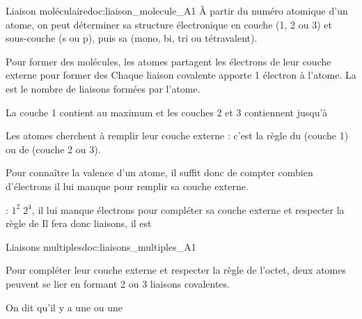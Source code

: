 \begin{doc}{Liaison moléculaire}{doc:liaison_molecule_A1}
  À partir du numéro atomique d'un atome, on peut déterminer sa structure électronique en couche (1, 2 ou 3) et sous-couche (s ou p), puis sa  (mono, bi, tri ou tétravalent).
  \begin{importants}
    Pour former des molécules, les atomes partagent les électrons de leur couche externe pour former des 
    Chaque liaison covalente apporte 1 électron à l'atome.
    La  est le nombre de liaisons formées par l'atome.
  \end{importants}
  \begin{importants}
    La couche 1 contient au maximum  et les couches 2 et 3 contiennent jusqu'à 

    Les atomes cherchent à remplir leur couche externe : c'est la règle du  (couche 1) ou de  (couche 2 ou 3).
  \end{importants}
  Pour connaître la valence d'un atome, il suffit donc de compter combien d'électrons il lui manque pour remplir sa couche externe.

  \exemple {} : $1^2\; 2^4$,
  il lui manque  électrons pour compléter sa couche externe et respecter la règle de 
  Il fera donc  liaisons, il est 
\end{doc}



%
\newpage
\vspace*{-30pt}


\begin{doc}{Liaisons multiples}{doc:liaisons_multiples_A1}
  \begin{importants}
    Pour compléter leur couche externe et respecter la règle de l'octet, deux atomes peuvent se lier en formant 2 ou 3 liaisons covalentes.
    
    On dit qu'il y a une  ou une 
  \end{importants}
\end{doc}

